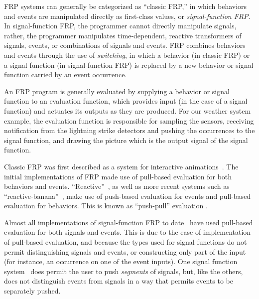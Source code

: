 
FRP systems can generally be categorized as ``classic FRP,'' in which behaviors
and events are manipulated directly as first-class values,
or {\em signal-function FRP}. In signal-function FRP, the programmer cannot
directly manipulate signals, rather, the programmer manipulates time-dependent,
reactive transformers of signals, events, or combinations of signals and events.
%
FRP combines behaviors and events through the use of {\em switching}, in which
a behavior (in classic FRP) or a signal function (in signal-function FRP) is
replaced by a new behavior or signal function carried by an event occurrence.

An FRP program is generally evaluated by supplying a behavior or signal function
to an evaluation function, which provides input (in the case of a signal
function) and actuates its outputs as they are produced. For our weather system
example, the evaluation function is responsible for sampling the sensors,
receiving notification from the lightning strike detectors and pushing the
occurrences to the signal function, and drawing the picture which is the output
signal of the signal function.

Classic FRP was first described as a system for interactive animations~\cite{Elliott1997}.
The initial implementations of FRP made use of
pull-based evaluation for both behaviors and events.
``Reactive''~\cite{Elliott2009}, as well as more recent systems such as
``reactive-banana''~\cite{Apfelmus}, make use of push-based evaluation for
events and pull-based evaluation for behaviors. This is known as ``push-pull''
evaluation .

Almost all implementations of signal-function FRP to
date~\cite{Courtney2001-1,Nilsson2002,Nilsson2005,Sculthorpe2011} have used
pull-based evaluation for both signals and events. This is due to the ease of
implementation of pull-based evaluation, and because the types used for signal
functions do not permit distinguishing signals and events, or constructing only
part of the input (for instance, an occurrence on one of the event inputs). One
signal function system~\cite{Jeffrey2012} does permit the user to push
{\em segments} of signals, but, like the others, does not distinguish events
from signals in a way that permits events to be separately pushed.

